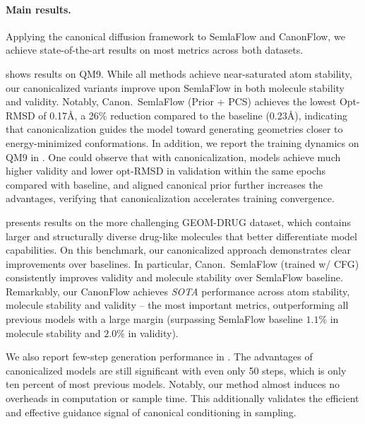\documentclass{article}
\theoremstyle{plain}
\theoremstyle{definition}
\theoremstyle{remark}
\newcommand{\1}{\mathbf{1}}
\begin{document}
\vspace{-1pt}
\paragraph{Main results.} 
Applying the canonical diffusion framework to SemlaFlow and CanonFlow, we achieve state-of-the-art results on most metrics across both datasets.

 shows results on QM9.
While all methods achieve near-saturated atom stability, our canonicalized variants improve upon SemlaFlow in both molecule stability and validity.
Notably, Canon.\ SemlaFlow (Prior + PCS) achieves the lowest Opt-RMSD of 0.17\AA, a 26\% reduction compared to the baseline (0.23\AA), indicating that canonicalization guides the model toward generating geometries closer to energy-minimized conformations.
In addition, we report the training dynamics on QM9 in . One could observe that with canonicalization, models achieve much higher validity and lower opt-RMSD in validation within the same epochs compared with baseline, and aligned canonical prior further increases the advantages, verifying that canonicalization accelerates training convergence.


 presents results on the more challenging GEOM-DRUG dataset, which contains larger and structurally diverse drug-like molecules that better differentiate model capabilities.
On this benchmark, our canonicalized approach demonstrates clear improvements over baselines.
In particular, Canon.\ SemlaFlow (trained w/ CFG) consistently improves validity and molecule stability over SemlaFlow baseline. Remarkably, our CanonFlow achieves \emph{SOTA} performance across atom stability, molecule stability and validity -- the most important metrics, outperforming all previous models with a large margin (surpassing SemlaFlow baseline $1.1\%$ in molecule stability and $2.0\%$ in validity).


We also report few-step generation performance in . The advantages of canonicalized models are still significant with even only 50 steps, which is only ten percent of most previous models. Notably, our method almost induces no overheads in computation or sample time. This additionally validates the efficient and effective guidance signal of canonical conditioning in sampling.
\end{document}
